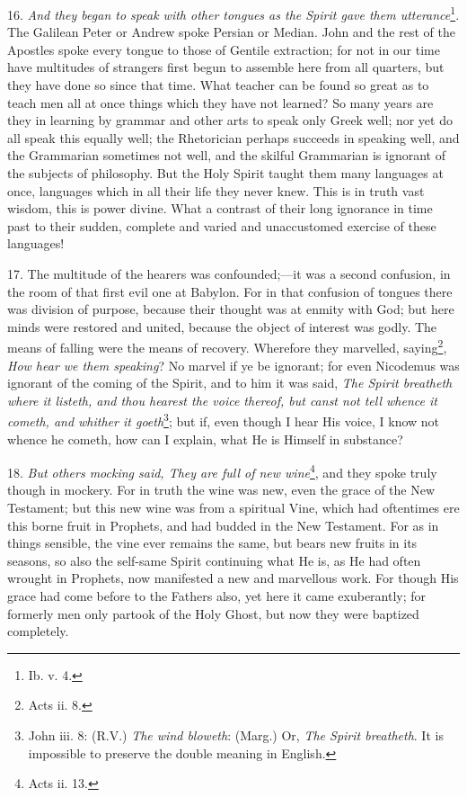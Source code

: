 16. \emph{And they began to speak with other tongues as the Spirit gave them utterance}\footnote{Ib. v. 4.}. The Galilean Peter or Andrew spoke Persian or Median. John and the rest of the Apostles spoke every tongue to those of Gentile extraction; for not in our time have multitudes of strangers first begun to assemble here from all quarters, but they have done so since that time. What teacher can be found so great as to teach men all at once things which they have not learned? So many years are they in learning by grammar and other arts to speak only Greek well; nor yet do all speak this equally well; the Rhetorician perhaps succeeds in speaking well, and the Grammarian sometimes not well, and the skilful Grammarian is ignorant of the subjects of philosophy. But the Holy Spirit taught them many languages at once, languages which in all their life they never knew. This is in truth vast wisdom, this is power divine. What a contrast of their long ignorance in time past to their sudden, complete and varied and unaccustomed exercise of these languages!

17. The multitude of the hearers was confounded;—it was a second confusion, in the room of that first evil one at Babylon. For in that confusion of tongues there was division of purpose, because their thought was at enmity with God; but here minds were restored and united, because the object of interest was godly. The means of falling were the means of recovery. Wherefore they marvelled, saying\footnote{Acts ii. 8.}, \emph{How hear we them speaking}? No marvel if ye be ignorant; for even Nicodemus was ignorant of the coming of the Spirit, and to him it was said, \emph{The Spirit breatheth where it listeth, and thou hearest the voice thereof, but canst not tell whence it cometh, and whither it goeth}\footnote{John iii. 8: (R.V.) \emph{The wind bloweth}: (Marg.) Or, \emph{The Spirit breatheth}. It is impossible to preserve the double meaning in English.}; but if, even though I hear His voice, I know not whence he cometh, how can I explain, what He is Himself in substance?

18. \emph{But others mocking said, They are full of new wine}\footnote{Acts ii. 13.}, and they spoke truly though in mockery. For in truth the wine was new, even the grace of the New Testament; but this new wine was from a spiritual Vine, which had oftentimes ere this borne fruit in Prophets, and had budded in the New Testament. For as in things sensible, the vine ever remains the same, but bears new fruits in its seasons, so also the self-same Spirit continuing what He is, as He had often wrought in Prophets, now manifested a new and marvellous work. For though His grace had come before to the Fathers also, yet here it came exuberantly; for formerly men only partook of the Holy Ghost, but now they were baptized completely.

